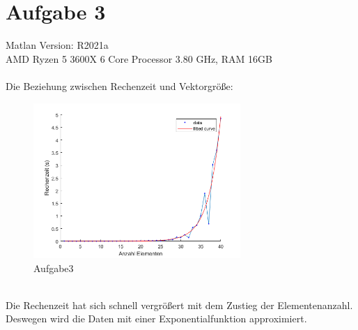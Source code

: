 \section{Aufgabe 3}
Matlan Version: R2021a \\
AMD Ryzen 5 3600X 6 Core Processor 3.80 GHz, RAM 16GB\\\\
Die Beziehung zwischen Rechenzeit und Vektorgröße:
\begin{figure}[htbp]
	\centering
	\includegraphics[width=0.7\textwidth]{images/A3} 
	\caption{Aufgabe3} 
	\label{fig:A3}
\end{figure}\\
Die Rechenzeit hat sich schnell vergrößert mit dem Zustieg der Elementenanzahl. Deswegen wird die Daten mit einer Exponentialfunktion approximiert. 


